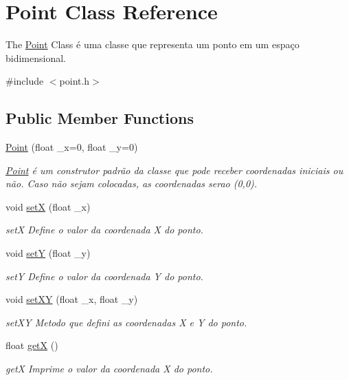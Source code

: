 \hypertarget{class_point}{}\section{Point Class Reference}
\label{class_point}


The \hyperlink{class_point}{Point} Class é uma classe que representa um ponto em um espaço bidimensional.  




{\ttfamily \#include $<$point.\+h$>$}

\subsection*{Public Member Functions}
\begin{DoxyCompactItemize}
\item 
\hyperlink{class_point_a06c32166c2ad9eac25799ef189b49683}{Point} (float \+\_\+x=0, float \+\_\+y=0)
\begin{DoxyCompactList}\small\item\em \hyperlink{class_point}{Point} é um construtor padrão da classe que pode receber coordenadas iniciais ou não. Caso não sejam colocadas, as coordenadas serao (0,0). \end{DoxyCompactList}\item 
void \hyperlink{class_point_a428a1676e2fdec6753c42011a1d59d18}{setX} (float \+\_\+x)
\begin{DoxyCompactList}\small\item\em setX Define o valor da coordenada X do ponto. \end{DoxyCompactList}\item 
void \hyperlink{class_point_a9868c4601b0ea0c2d0de20fe41ee0e49}{setY} (float \+\_\+y)
\begin{DoxyCompactList}\small\item\em setY Define o valor da coordenada Y do ponto. \end{DoxyCompactList}\item 
void \hyperlink{class_point_ab5385c6d9bfa841e641e4709fc9f14cc}{set\+XY} (float \+\_\+x, float \+\_\+y)
\begin{DoxyCompactList}\small\item\em set\+XY Metodo que defini as coordenadas X e Y do ponto. \end{DoxyCompactList}\item 
float \hyperlink{class_point_acc27466778cc87a662bba40268c4c0c8}{getX} ()
\begin{DoxyCompactList}\small\item\em getX Imprime o valor da coordenada X do ponto. \end{DoxyCompactList}\item 

\end{DoxyCompactItemize}
